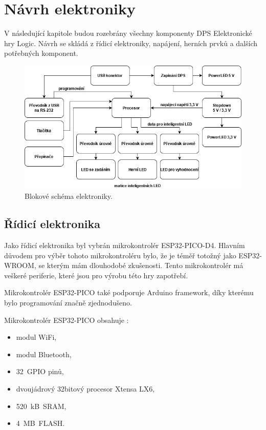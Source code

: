 \chapter{Návrh elektroniky}
V následující kapitole budou rozebrány všechny komponenty DPS Elektronické hry Logic. Návrh se skládá z řídicí elektroniky, 
napájení, herních prvků a dalších potřebných komponent.

\begin{figure}[!h]
  \begin{center}
    \includegraphics[scale=0.6]{obrazky/v2_blokove_schema.jpg}
  \end{center}
  \caption[Blokové schéma elektroniky]{Blokové schéma elektroniky.}
\end{figure}    

\section{Řídicí elektronika} \label{Ridici_elektronika}
Jako řídicí elektronika byl vybrán mikrokontrolér ESP32-PICO-D4. Hlavním důvodem pro výběr tohoto mikrokontroléru bylo, že je téměř totožný 
jako ESP32-WROOM, se 
kterým mám dlouhodobé zkušenosti. Tento mikrokontrolér má veškeré periferie, které jsou pro výrobu této hry zapotřebí. 

Mikrokontrolér ESP32-PICO také podporuje Arduino framework, díky kterému bylo programování značně zjednodušeno.

Mikrokontrolér ESP32-PICO obsahuje \cite{PICO_datasheet}: 
\begin{itemize}
    \item modul WiFi,
    \item modul Bluetooth, 
    \item 32~GPIO pinů, 
    \item dvoujádrový 32bitový procesor Xtensa LX6,
    \item 520~kB~SRAM, 
    \item 4~MB~FLASH. 
  \end{itemize}

